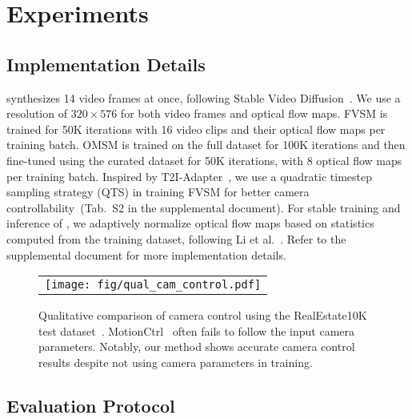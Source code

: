 







\section{Experiments}
\label{sec:experiment}

\subsection{Implementation Details}
\label{sec:implementation_detail}
\MethodName{} synthesizes 14 video frames at once, following Stable Video Diffusion~\cite{blattmann2023stable}.
We use a resolution of $320 \times 576$ for both video frames and optical flow maps.
FVSM is trained for 50K iterations with 16 video clips and their optical flow maps per training batch.
OMSM is trained on the full dataset for 100K iterations and then fine-tuned using the curated dataset for 50K iterations, with 8 optical flow maps per training batch.
Inspired by T2I-Adapter~\cite{mou2024t2i}, we use a quadratic timestep sampling strategy (QTS) in training FVSM for better camera controllability~(Tab.~S2 in the supplemental document).
For stable training and inference of \MethodName{}, we adaptively normalize optical flow maps based on statistics computed from the training dataset, following Li et al.~\cite{li2024generative}.
Refer to the supplemental document for more implementation details.




\begin{figure*}[!t]
\centering
\begin{tabular}{@{}c}
\texttt{[image: fig/qual\_cam\_control.pdf]} \\
\end{tabular}
\vspace{-4mm}
\caption{
Qualitative comparison of camera control using the RealEstate10K test dataset~\cite{zhou2018stereo}.
MotionCtrl~\cite{wang2024motionctrl} often fails to follow the input camera parameters.
Notably, our method shows accurate camera control results despite not using camera parameters in training.
}
\label{fig:qual_cam_control}
\vspace{-4.5mm}
\end{figure*}


\subsection{Evaluation Protocol}
\label{sec:evaluation_protocol}


